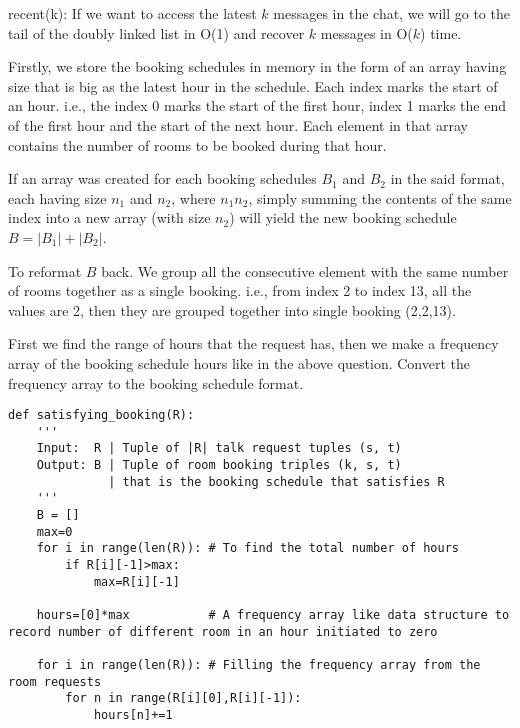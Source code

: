 \documentclass[12pt,twoside]{article}
\begin{document}
\begin{problems}
recent(k): If we want to access the latest $k$ messages in the chat, we will go to the tail of the doubly linked list in O(1) and recover $k$ messages in O($k$) time.



\newpage
\problem  %

\begin{problemparts}

\problempart %
Firstly, we store the booking schedules in memory in the form of an array having size that is big as the latest hour in the schedule. Each index marks the start of an hour. i.e., the index 0 marks the start of the first hour, index 1 marks the end of the first hour and the start of the next hour. Each element in that array contains the number of rooms to be booked during that hour.

If an array was created for each booking schedules $B_1$ and $B_2$ in the said format, each having size $n_1$ and $n_2$, where $n_1 n_2$, simply summing the contents of the same index into a new array (with size $n_2$) will yield the new booking schedule $B = |B_1|+|B_2|$.

To reformat $B$ back. We group all the consecutive element with the same number of rooms together as a single booking. i.e., from index 2 to index 13, all the values are 2, then they are grouped together into single booking (2,2,13).

\problempart %
First we find the range of hours that the request has, then we make a frequency array of the booking schedule hours like in the above question. Convert the frequency array to the booking schedule format.
\newpage
\problempart 
\begin{lstlisting}
def satisfying_booking(R):
    '''
    Input:  R | Tuple of |R| talk request tuples (s, t)
    Output: B | Tuple of room booking triples (k, s, t)
              | that is the booking schedule that satisfies R
    '''
    B = []
    max=0
    for i in range(len(R)): # To find the total number of hours
        if R[i][-1]>max:
            max=R[i][-1]
    
    hours=[0]*max           # A frequency array like data structure to record number of different room in an hour initiated to zero
    
    for i in range(len(R)): # Filling the frequency array from the room requests
        for n in range(R[i][0],R[i][-1]):
            hours[n]+=1
    

\end{lstlisting}
\end{problemparts}
\end{problems}
\end{document}
